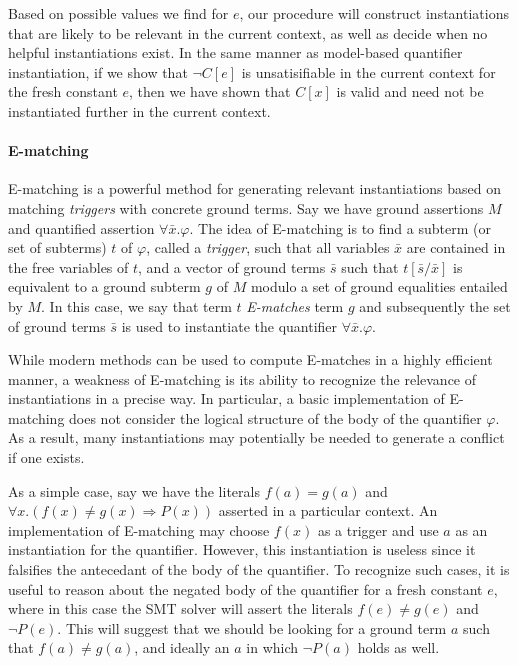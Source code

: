 \documentclass{llncs}
\begin{document}
Based on possible values we find for $e$, our procedure will construct instantiations that are likely to be relevant in the current context, as well as decide when no helpful instantiations exist.
In the same manner as model-based quantifier instantiation, if we show that $\neg C[e]$ is unsatisifiable in the current context for the fresh constant $e$, then we have shown that $C[x]$ is valid and need not be instantiated further in the current context.

\paragraph{E-matching}
E-matching is a powerful method for generating relevant instantiations based on matching \emph{triggers} with concrete ground terms. 
Say we have ground assertions $M$ and quantified assertion $\forall \bar{x}. \varphi$.
The idea of E-matching is to find a subterm (or set of subterms) $t$ of $\varphi$, called a \emph{trigger}, such that all variables $\bar{x}$ are contained in the free variables of $t$, and a vector of ground terms $\bar{s}$ such that $t[\bar{s}/\bar{x}]$ is equivalent to a ground subterm $g$ of $M$ modulo a set of ground equalities entailed by $M$.
In this case, we say that term $t$ \emph{E-matches} term $g$ and subsequently the set of ground terms $\bar{s}$ is used to instantiate the quantifier $\forall \bar{x}. \varphi$.

While modern methods can be used to compute E-matches in a highly efficient manner, a weakness of E-matching is its ability to recognize the relevance of instantiations in a precise way.
In particular, a basic implementation of E-matching does not consider the logical structure of the body of the quantifier $\varphi$.
As a result, many instantiations may potentially be needed to generate a conflict if one exists.

As a simple case, say we have the literals $f( a ) = g( a )$ and $\forall x. ( f(x) \neq g(x) \Rightarrow P( x ) )$ asserted in a particular context. 
An implementation of E-matching may choose $f( x )$ as a trigger and use $a$ as an instantiation for the quantifier.
However, this instantiation is useless since it falsifies the antecedant of the body of the quantifier.
To recognize such cases, it is useful to reason about the negated body of the quantifier for a fresh constant $e$, where in this case the SMT solver will assert the literals $f( e ) \neq g( e )$ and $\neg P( e )$.
This will suggest that we should be looking for a ground term $a$ such that $f( a ) \neq g( a )$, and ideally an $a$ in which $\neg P( a )$ holds as well.
\end{document}

